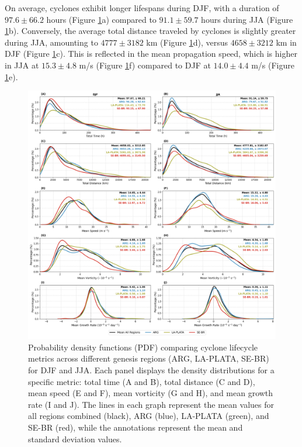 On average, cyclones exhibit longer lifespans during DJF, with a duration of $97.6 \pm 66.2$ hours (Figure \ref{fig:pdf_total_time_total}a) compared to $91.1 \pm 59.7$ hours during JJA (Figure \ref{fig:pdf_total_time_total}b). Conversely, the average total distance traveled by cyclones is slightly greater during JJA, amounting to $4777 \pm 3182$ km (Figure \ref{fig:pdf_total_time_total}d), versus $4658 \pm 3212$ km in DJF (Figure \ref{fig:pdf_total_time_total}c). This is reflected in the mean propagation speed, which is higher in JJA at $15.3 \pm 4.8$ m/s (Figure \ref{fig:pdf_total_time_total}f) compared to DJF at $14.0 \pm 4.4$ m/s (Figure \ref{fig:pdf_total_time_total}e).

\begin{figure}[h!]
\centering
\includegraphics[width=\textwidth]{figs_4/pdf_total_phase_all_metrics.png}
\caption[PDF - Metrics for Each Region and Season]{Probability density functions (PDF) comparing cyclone lifecycle metrics across different genesis regions (ARG, LA-PLATA, SE-BR) for DJF and JJA. Each panel displays the density distributions for a specific metric: total time (A and B), total distance (C and D), mean speed (E and F), mean vorticity (G and H), and mean growth rate (I and J). The lines in each graph represent the mean values for all regions combined (black), ARG (blue), LA-PLATA (green), and SE-BR (red), while the annotations represent the mean and standard deviation values.}
\label{fig:pdf_total_time_total}
\end{figure}


